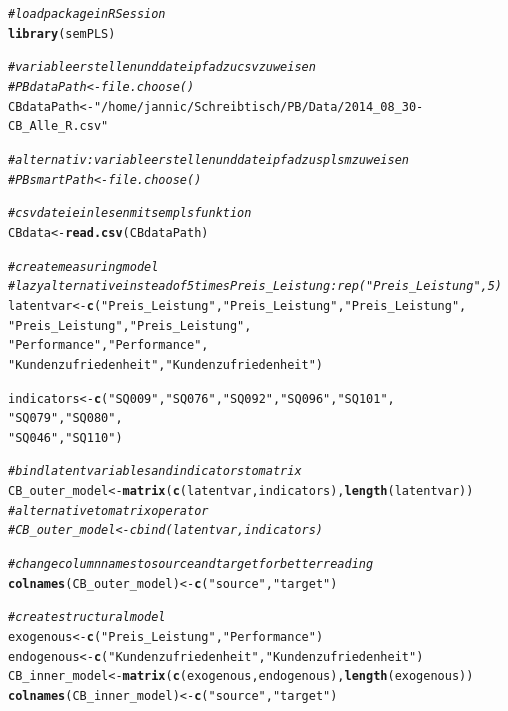 \documentclass{article}\usepackage[]{graphicx}\usepackage[]{color}
\makeatletter
\newcommand{\hlstr}[1]{\textcolor[rgb]{0.192,0.494,0.8}{#1}}%
\newcommand{\hlcom}[1]{\textcolor[rgb]{0.678,0.584,0.686}{\textit{#1}}}%
\newcommand{\hlstd}[1]{\textcolor[rgb]{0.345,0.345,0.345}{#1}}%
\newcommand{\hlkwb}[1]{\textcolor[rgb]{0.69,0.353,0.396}{#1}}%
\newcommand{\hlkwd}[1]{\textcolor[rgb]{0.737,0.353,0.396}{\textbf{#1}}}%
\newenvironment{kframe}{%
 \def\at@end@of@kframe{}%
 \ifinner\ifhmode%
  \def\at@end@of@kframe{\end{minipage}}%
  \begin{minipage}{\columnwidth}%
 \fi\fi%
 \def\FrameCommand##1{\hskip\@totalleftmargin \hskip-\fboxsep
 \colorbox{shadecolor}{##1}\hskip-\fboxsep
     \hskip-\linewidth \hskip-\@totalleftmargin \hskip\columnwidth}%
 \MakeFramed {\advance\hsize-\width
   \@totalleftmargin\z@ \linewidth\hsize
   \@setminipage}}%
 {\par\unskip\endMakeFramed%
 \at@end@of@kframe}
\newenvironment{knitrout}{}{} %
\makeatother
\begin{document}
\begin{knitrout}
\color{fgcolor}\begin{kframe}
\begin{alltt}
\hlcom{#load package in R Session}
\hlkwd{library}\hlstd{(semPLS)}

\hlcom{# variable erstellen und dateipfad zu csv zuweisen}
\hlcom{#PBdataPath <- file.choose()}
\hlstd{CBdataPath} \hlkwb{<-} \hlstr{"/home/jannic/Schreibtisch/PB/Data/2014_08_30-CB_Alle_R.csv"}

\hlcom{# alternativ: variable erstellen und dateipfad zu splsm zuweisen}
\hlcom{#PBsmartPath <- file.choose()}

\hlcom{#csv datei einlesen mit sempls funktion}
\hlstd{CBdata} \hlkwb{<-} \hlkwd{read.csv}\hlstd{(CBdataPath)}

\hlcom{#create measuring model}
\hlcom{#lazy alternative instead of 5 times Preis_Leistung: rep("Preis_Leistung",5)}
\hlstd{latentvar} \hlkwb{<-} \hlkwd{c}\hlstd{(}\hlstr{"Preis_Leistung"}\hlstd{,}\hlstr{"Preis_Leistung"}\hlstd{,}\hlstr{"Preis_Leistung"}\hlstd{,}
               \hlstr{"Preis_Leistung"}\hlstd{,}\hlstr{"Preis_Leistung"}\hlstd{,}
              \hlstr{"Performance"}\hlstd{,}\hlstr{"Performance"}\hlstd{,}
              \hlstr{"Kundenzufriedenheit"}\hlstd{,}\hlstr{"Kundenzufriedenheit"}\hlstd{)}

\hlstd{indicators} \hlkwb{<-} \hlkwd{c}\hlstd{(}\hlstr{"SQ009"}\hlstd{,}\hlstr{"SQ076"}\hlstd{,}\hlstr{"SQ092"}\hlstd{,}\hlstr{"SQ096"}\hlstd{,}\hlstr{"SQ101"}\hlstd{,}
                \hlstr{"SQ079"}\hlstd{,}\hlstr{"SQ080"}\hlstd{,}
               \hlstr{"SQ046"}\hlstd{,}\hlstr{"SQ110"}\hlstd{)}

\hlcom{#bind latent variables and indicators to matrix}
\hlstd{CB_outer_model} \hlkwb{<-} \hlkwd{matrix}\hlstd{(}\hlkwd{c}\hlstd{(latentvar,indicators),}\hlkwd{length}\hlstd{(latentvar))}
\hlcom{#alternative to matrix operator}
\hlcom{#CB_outer_model <- cbind(latentvar,indicators)}

\hlcom{#change column names to source and target for better reading}
\hlkwd{colnames}\hlstd{(CB_outer_model)} \hlkwb{<-} \hlkwd{c}\hlstd{(}\hlstr{"source"}\hlstd{,}\hlstr{"target"}\hlstd{)}

\hlcom{#create structural model}
\hlstd{exogenous} \hlkwb{<-} \hlkwd{c}\hlstd{(}\hlstr{"Preis_Leistung"}\hlstd{,}\hlstr{"Performance"}\hlstd{)}
\hlstd{endogenous} \hlkwb{<-} \hlkwd{c}\hlstd{(}\hlstr{"Kundenzufriedenheit"}\hlstd{,}\hlstr{"Kundenzufriedenheit"}\hlstd{)}
\hlstd{CB_inner_model} \hlkwb{<-} \hlkwd{matrix}\hlstd{(}\hlkwd{c}\hlstd{(exogenous,endogenous),}\hlkwd{length}\hlstd{(exogenous))}
\hlkwd{colnames}\hlstd{(CB_inner_model)} \hlkwb{<-} \hlkwd{c}\hlstd{(}\hlstr{"source"}\hlstd{,}\hlstr{"target"}\hlstd{)}


\end{alltt}
\end{kframe}
\end{knitrout}
\end{document}
